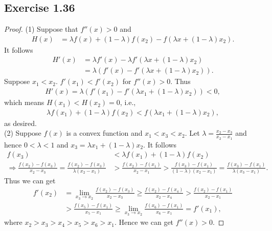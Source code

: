 \documentclass[11pt]{article}
\theoremstyle{definition}
\begin{document}
\subsection{Exercise 1.36}
\begin{proof}
(1) Suppose that $f''(x) > 0$ and 
\begin{align*}
H(x) &= \lambda f(x) + (1-\lambda)f(x_2) - f(\lambda x + (1-\lambda)x_2).
\end{align*}
It follows
\begin{align*}
H'(x) &= \lambda f'(x) - \lambda f'(\lambda x + (1-\lambda)x_2) \\
&= \lambda(f'(x) - f'(\lambda x + (1-\lambda)x_2)).
\end{align*}
Suppose $x_1 < x_2$. $f'(x_1) < f'(x_2)$ for $f''(x) > 0$. Thus
\begin{align*}
H'(x) = \lambda(f'(x_1) - f'(\lambda x_1 + (1-\lambda)x_2)) < 0,
\end{align*}
which means $H(x_1) < H(x_2) = 0$, i.e.,
\begin{align*}
\lambda f(x_1) + (1-\lambda)f(x_2) < f(\lambda x_1 + (1-\lambda)x_2),
\end{align*}
as desired.\\
(2) Suppose $f(x)$ is a convex function and $x_1 < x_3 < x_2$. Let $\lambda = \frac{x_2-x_3}{x_2-x_1}$ and hence $0 < \lambda < 1$ and $x_3 = \lambda x_1 + (1-\lambda)x_2$. It follows
\begin{align*}
f(x_3) &< \lambda f(x_1) + (1-\lambda)f(x_2) \\
\Rightarrow \frac{f(x_2) - f(x_3)}{x_2-x_3} = \frac{f(x_2) - f(x_3)}{\lambda(x_2-x_1)} &> \frac{f(x_2) - f(x_1)}{x_2-x_1} > \frac{f(x_3) - f(x_1)}{(1-\lambda)(x_2-x_1)} = \frac{f(x_3) - f(x_1)}{\lambda(x_3-x_1)}.
\end{align*}
Thus we can get
\begin{align*}
f'(x_2) &= \lim_{x_3\rightarrow x_2}\frac{f(x_2) - f(x_3)}{x_2-x_3} \geq \frac{f(x_2) - f(x_4)}{x_2-x_4} > \frac{f(x_2) - f(x_1)}{x_2-x_1} \\
&> \frac{f(x_5) - f(x_1)}{x_5-x_1} \geq \lim_{x_3\rightarrow x_2}\frac{f(x_6) - f(x_1)}{x_6-x_1} = f'(x_1),
\end{align*}
where $x_2 > x_3 > x_4 > x_5 > x_6 > x_1$. Hence we can get $f''(x) > 0$.
\end{proof}
\end{document}
